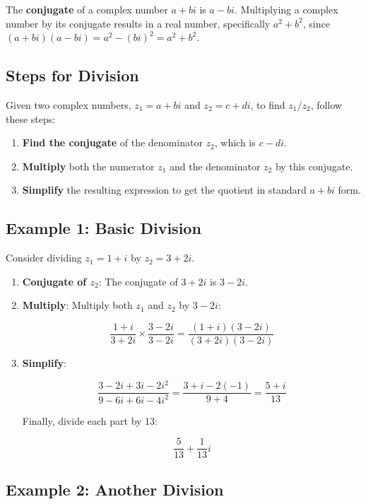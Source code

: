 \documentclass[
]{article}
\providecommand{\tightlist}{%
  \setlength{\itemsep}{0pt}\setlength{\parskip}{0pt}}
\def\tightlist{}
\begin{document}
The \textbf{conjugate} of a complex number \(a + bi\) is \(a - bi\).
Multiplying a complex number by its conjugate results in a real number,
specifically \(a^2 + b^2\), since
\((a + bi)(a - bi) = a^2 - (bi)^2 = a^2 + b^2\).

\subsection{Steps for Division}\label{steps-for-division}

Given two complex numbers, \(z_1 = a + bi\) and \(z_2 = c + di\), to
find \(z_1 / z_2\), follow these steps:

\begin{enumerate}
\def\labelenumi{\arabic{enumi}.}
\tightlist
\item
  \textbf{Find the conjugate} of the denominator \(z_2\), which is
  \(c - di\).
\item
  \textbf{Multiply} both the numerator \(z_1\) and the denominator
  \(z_2\) by this conjugate.
\item
  \textbf{Simplify} the resulting expression to get the quotient in
  standard \(a + bi\) form.
\end{enumerate}

\subsection{Example 1: Basic Division}\label{example-1-basic-division}

Consider dividing \(z_1 = 1 + i\) by \(z_2 = 3 + 2i\).

\begin{enumerate}
\def\labelenumi{\arabic{enumi}.}
\item
  \textbf{Conjugate of \(z_2\)}: The conjugate of \(3 + 2i\) is
  \(3 - 2i\).
\item
  \textbf{Multiply}: Multiply both \(z_1\) and \(z_2\) by \(3 - 2i\):

  \[
  \frac{1 + i}{3 + 2i} \times \frac{3 - 2i}{3 - 2i} = \frac{(1 + i)(3 - 2i)}{(3 + 2i)(3 - 2i)}
  \]
\item
  \textbf{Simplify}:

  \[
  \frac{3 - 2i + 3i - 2i^2}{9 - 6i + 6i - 4i^2} = \frac{3 + i - 2(-1)}{9 + 4} = \frac{5 + i}{13}
  \]

  Finally, divide each part by 13:

  \[
  \frac{5}{13} + \frac{1}{13}i
  \]
\end{enumerate}

\subsection{Example 2: Another
Division}\label{example-2-another-division}
\end{document}
